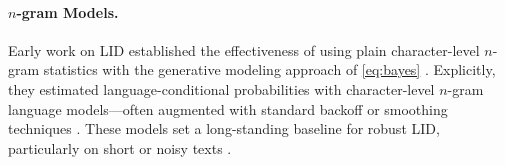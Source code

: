\documentclass{article}
\makeatletter
\DeclareRobustCommand*{\escapeus}[1]{%
  \begingroup
    \edef\x{\endgroup
      \noexpand\@escapeusaux{\unexpanded{#1}}}%
  \x}
\def\@escapeusaux#1{%
  \begingroup
    \@activeus
    \scantokens{#1\endinput}%
  \endgroup}
\def\@activeus{\catcode`\_=\active \let~\_}}
\newcommand{\myemph}[1]{\textsf{{\escapeus{#1}}}}
\newcommand{\eg}{\emph{e.g.}\@\xspace}
\newcommand{\ngram}{$n$-gram\xspace}
\newcommand{\stringunit}{s}
\newcommand{\str}{\mathbf{\stringunit}}
\newcommand{\stringidx}{t}
\newcommand{\lang}{\ell}
\newcommand{\model}{p_{\theta}}
\makeatother
\begin{document}
\paragraph{\ngram Models.} 
Early work on LID established the effectiveness of using plain character-level \ngram statistics with the generative modeling approach of \cref{eq:bayes} \cite{cavnar01,dunning1994statistical}. Explicitly, they estimated language-conditional probabilities with character-level \ngram language models---often augmented with standard backoff or smoothing techniques \citep[\eg, Kneser--Essen--Ney smoothing;][]{kneser}.
These models set a long-standing baseline for robust LID, particularly on short or noisy texts \cite{Vatanen10LREC,baldwin-lui-2010-language}.

\end{document}
